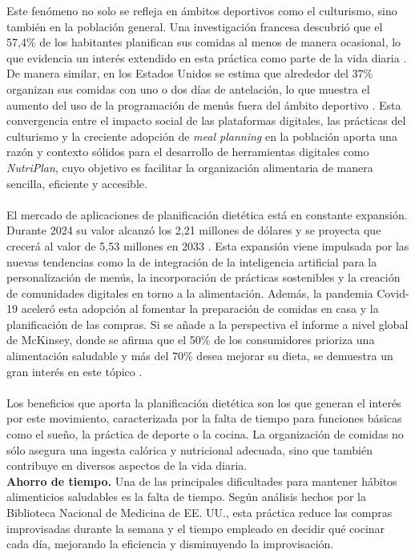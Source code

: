 \documentclass[twoside, openright, 11pt]{report}
\begin{document}
	  Este fenómeno no solo se refleja en ámbitos deportivos como el culturismo, sino también en la población general. Una investigación francesa descubrió que el 57,4\% de los habitantes planifican sus comidas al menos de manera ocasional, lo que evidencia un interés extendido en esta práctica como parte de la vida diaria \cite{ducrot2017}. De manera similar, en los Estados Unidos se estima que alrededor del 37\% organizan sus comidas con uno o dos días de antelación, lo que muestra el aumento del uso de la programación de menús fuera del ámbito deportivo \cite{fmi2015}. Esta convergencia entre el impacto social de las plataformas digitales, las prácticas del culturismo y la creciente adopción de \textit{meal planning} en la población aporta una razón y contexto sólidos para el desarrollo de herramientas digitales como \textit{NutriPlan}, cuyo objetivo es facilitar la organización alimentaria de manera sencilla, eficiente y accesible.
	  \\\\
	  El mercado de aplicaciones de planificación dietética está en constante expansión. Durante 2024 su valor alcanzó los 2,21 millones de dólares y se proyecta que crecerá al valor de 5,53 millones en 2033 \cite{businessresearchinsights2024}. Esta expansión viene impulsada por las nuevas tendencias como la de integración de la inteligencia artificial para la personalización de menús, la incorporación de prácticas sostenibles y la creación de comunidades digitales en torno a la alimentación. Además, la pandemia Covid-19 aceleró esta adopción al fomentar la preparación de comidas en casa y la planificación de las compras. Si se añade a la perspectiva el informe a nivel global de McKinsey, donde se afirma que el 50\% de los consumidores prioriza una alimentación saludable y más del 70\% desea mejorar su dieta, se demuestra un gran interés en este tópico \cite{mckinsey2023}.
	  \\\\
	  Los beneficios que aporta la planificación dietética son los que generan el interés por este movimiento, caracterizada por la falta de tiempo para funciones básicas como el sueño, la práctica de deporte o la cocina. La organización de comidas no sólo asegura una ingesta calórica y nutricional adecuada, sino que también contribuye en diversos aspectos de la vida diaria.\\
	  \textbf{Ahorro de tiempo.} Una de las principales dificultades para mantener hábitos alimenticios saludables es la falta de tiempo. Según análisis hechos por la Biblioteca Nacional de Medicina de EE. UU., esta práctica reduce las compras improvisadas durante la semana y el tiempo empleado en decidir qué cocinar cada día, mejorando la eficiencia y disminuyendo la improvisación.
\end{document}
